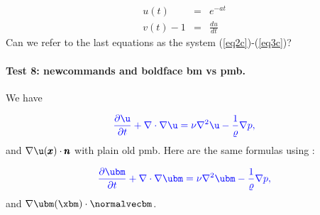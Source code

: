 \documentclass[%
oneside,                 %
final,                   %
10pt]{article}
\begin{document}
\begin{eqnarray}
u(t)&=& e^{-at} \label{eq2c}\\ 
v(t) - 1 &=& \frac{du}{dt} \label{eq3c}
\end{eqnarray}
Can we refer to the last equations as the system (\ref{eq2c})-(\ref{eq3c})?

\paragraph{Test 8: newcommands and boldface bm vs pmb.}
We have

\[ \color{blue}{\frac{\partial\u}{\partial t}} +
\nabla\cdot\nabla\u = \nu\nabla^2\u -
\frac{1}{\varrho}\nabla p,\]
and $\nabla\u (\x)\cdot\normalvec$
with plain old pmb. Here are the same formulas using \code{\bm}:

\[ \color{blue}{\frac{\partial\ubm}{\partial t}} +
\nabla\cdot\nabla\ubm = \nu\nabla^2\ubm -
\frac{1}{\varrho}\nabla p,\]
and $\nabla\ubm (\xbm)\cdot\normalvecbm$.




\printindex
\end{document}
